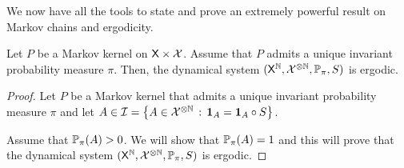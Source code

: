 \documentclass[english,graybox,envcountchap,envcountsame,sectrefs,shortlabels]{svmono}
\theoremstyle{style}
\newenvironment{svmultproof}{\small \begin{proof}}{\end{proof}}
\newcommand{\bs}{\begin{shaded}}
\newcommand{\es}{\end{shaded}}
\begin{document}
We now have all the tools to state and prove an extremely powerful
result on Markov chains and ergodicity.

\bs
\begin{theorem}\label{ergodic}
Let $P$ be a Markov kernel on $\mathsf{X}\times\mathcal{X}$. Assume that
$P$ admits a unique invariant probability measure $\pi$. Then, the
dynamical system $(\mathsf{X}^{\mathbb{N}},\mathcal{X}^{\otimes\mathbb{N}},\mathbb{P}_{\pi},S)$
is ergodic.
\end{theorem}
\es
\begin{svmultproof}
Let $P$ be a Markov kernel that admits a unique invariant probability
measure $\pi$ and let $A\in\mathcal{I}=\left\{ A\in\mathcal{X}^{\otimes\mathbb{N}}\,:\,\mathbf{1}_{A}=\mathbf{1}_{A}\circ S\right\}$.

Assume that $\mathbb{P}_{\pi}(A)>0$. We will show that $\mathbb{P}_{\pi}(A)=1$
and this will prove that the dynamical system $(\mathsf{X}^{\mathbb{N}},\mathcal{X}^{\otimes\mathbb{N}},\mathbb{P}_{\pi},S)$
is ergodic.


\end{svmultproof}
\end{document}
